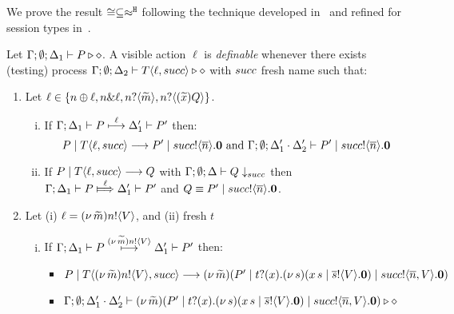 We prove the result $\cong \subseteq \approx^\mathtt{H}$ following
the technique developed in~\cite{Hennessy07} and
refined for session types in~\cite{KYHH2015,KY2015}.


\begin{definition}[Definability]\myrm
	\label{app:def:definibility}
	Let $\Gamma; \emptyset; \Delta_1 \vdash P \triangleright \diamond$.
	A visible action $\ell$ is \emph{definable} whenever
	there exists (testing) process
	$\Gamma; \emptyset; \Delta_2 \vdash T\langle \ell, succ \rangle \triangleright \diamond$
	with $succ$ fresh name %
	such that:
%
	\begin{enumerate}
		\item	Let $\ell \in \{n \oplus \ell, n \& \ell, n ? \langle \widetilde{m} \rangle, n ? \langle (\widetilde{x}) Q \rangle\}$.
		
			\begin{enumerate}[i.]
				\item	If $\Gamma; \Delta_1 \vdash P \stackrel{\ell}{\longmapsto} \Delta_1' \vdash P'$
						then:
						\[
							P \;|\; T\langle \ell, succ \rangle \longrightarrow P' \;|\; succ ! \langle \overline{n} \rangle . \mathbf{0} \textrm{ and }
							\Gamma; \emptyset; \Delta_1' \cdot \Delta_2' \vdash P' \;|\; succ ! \langle \overline{n} \rangle . \mathbf{0}
						\]

				\item
						If $P \;|\; T\langle \ell, succ \rangle \longrightarrow Q$ with			
						$\Gamma; \emptyset; \Delta \vdash Q \downarrow_{succ}$ then \\
						$\horel{\Gamma}{\Delta_1}{P}{\Hby{\ell}}{\Delta_1'}{P'}$
						and $Q \equiv P' \;|\; succ ! \langle \overline{n} \rangle . \mathbf{0}$.
			\end{enumerate}
%
 		\item Let	(i) $\ell = (\nu\, \widetilde{m})n ! \langle V \rangle$,
					and (ii) fresh $t$%

			\begin{enumerate}[i.]
				\item	If $\Gamma; \Delta_1 \vdash P \stackrel{(\nu\, \widetilde{m})n ! \langle V \rangle}{\longmapsto} \Delta_1' \vdash P'$
						then:
%
						\begin{itemize}
							\item $P \;|\; T\langle (\nu\, \widetilde{m})n ! \langle V \rangle, succ \rangle \longrightarrow
							(\nu\, \widetilde{m})(P' \;|\; t ? (x) . (\nu\, s)(x\, {s} \;|\; \overline{s} ! \langle V \rangle . \mathbf{0}) \;|\; succ ! \langle \overline{n}, V \rangle . \mathbf{0})$
							\item $\Gamma; \emptyset; \Delta_1' \cdot \Delta_2' \vdash
							(\nu\, \widetilde{m})(P' \;|\; t ? (x) . (\nu\, s)(x\, {s} \;|\; \overline{s} ! \langle V \rangle . \mathbf{0}) \;|\;  succ ! \langle \overline{n}, V \rangle . \mathbf{0}) \triangleright \diamond$
						\end{itemize}


\end{enumerate}
\end{enumerate}
\end{definition}
